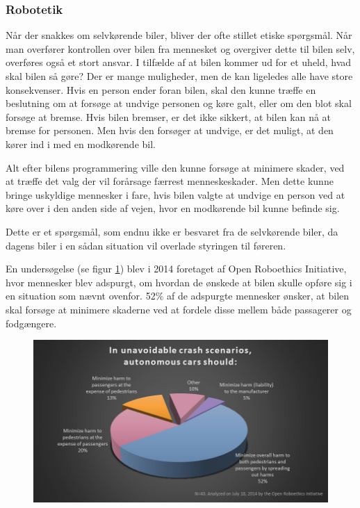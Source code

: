 \subsubsection{Robotetik}
	Når der snakkes om selvkørende biler, bliver der ofte stillet etiske spørgsmål. Når man overfører kontrollen over bilen fra mennesket og overgiver dette til bilen selv, overføres også et stort ansvar. I tilfælde af at bilen kommer ud for et uheld, hvad skal bilen så gøre? Der er mange muligheder, men de kan ligeledes alle have store konsekvenser. Hvis en person ender foran bilen, skal den kunne træffe en beslutning om at forsøge at undvige personen og køre galt, eller om den blot skal forsøge at bremse. Hvis bilen bremser, er det ikke sikkert, at bilen kan nå at bremse for personen. Men hvis den forsøger at undvige, er det muligt, at den kører ind i med en modkørende bil. 

	Alt efter bilens programmering ville den kunne forsøge at minimere skader, ved at træffe det valg der vil forårsage færrest menneskeskader. Men dette kunne bringe uskyldige mennesker i fare, hvis bilen valgte at undvige en person ved at køre over i den anden side af vejen, hvor en modkørende bil kunne befinde sig. 
	
	Dette er et spørgsmål, som endnu ikke er besvaret fra de selvkørende biler, da dagens biler i en sådan situation vil overlade styringen til føreren. 

	En undersøgelse (se figur \ref{fig:etik_accident}) blev i 2014 foretaget af Open Roboethics Initiative, hvor mennesker blev adspurgt, om hvordan de ønskede at bilen skulle opføre sig i en situation som nævnt ovenfor. 52\% af de adspurgte mennesker ønsker, at bilen skal forsøge at minimere skaderne ved at fordele disse mellem både passagerer og fodgængere. 
	

	\begin{figure}[h!]
		\centering
		\includegraphics[width=\textwidth]{images/roboethics-2.jpg}
		\label{fig:etik_accident}
	\end{figure}

